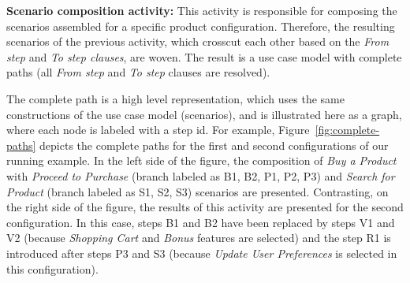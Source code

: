 \documentclass[11pt]{report}
\begin{document}
 {\bf Scenario composition activity:} This activity is responsible for composing the scenarios assembled for a specific product configuration. 
Therefore, the resulting scenarios of the previous activity, which crosscut each other based on the \emph{From step} and \emph{To step clauses}, are woven. The 
 result is a use case model with complete paths (all \emph{From step} and \emph{To step} clauses are resolved).
 
 
The complete path is a high level representation, which uses the same constructions of the use case model (scenarios), and is illustrated here as a graph, where each node is labeled with a step id. For example, Figure~\ref{fig:complete-paths} depicts the complete paths for the first and second configurations of our running example. In the left side of the figure,  the composition of \emph{Buy a Product} with \emph{Proceed to Purchase} (branch labeled as B1, B2, P1, P2, P3) and \emph{Search for Product} (branch labeled as S1, S2, S3) scenarios are presented. Contrasting, on the right side of the figure, the results of this activity are presented for the second configuration. In this case, steps B1 and B2 have been replaced by steps V1 and V2 (because \emph{Shopping Cart} and \emph{Bonus} features are selected) and the step  R1 is introduced after steps P3 and S3 (because \emph{Update User Preferences} is selected in this configuration).
 
 


\end{document}
